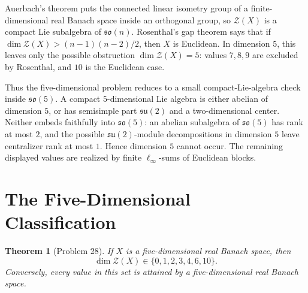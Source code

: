 \documentclass[11pt]{article}
\newtheorem{theorem}{Theorem}
\theoremstyle{remark}
\newcommand{\so}{\mathfrak{so}}
\newcommand{\su}{\mathfrak{su}}
\begin{document}
Auerbach's theorem puts the connected linear isometry group of a
finite-dimensional real Banach space inside an orthogonal group, so
\(\mathcal Z(X)\) is a compact Lie subalgebra of \(\so(n)\).  Rosenthal's
gap theorem says that if \(\dim\mathcal Z(X)>(n-1)(n-2)/2\), then \(X\) is
Euclidean.  In dimension \(5\), this leaves only the possible obstruction
\(\dim\mathcal Z(X)=5\): values \(7,8,9\) are excluded by Rosenthal, and
\(10\) is the Euclidean case.

Thus the five-dimensional problem reduces to a small compact-Lie-algebra
check inside \(\so(5)\).  A compact \(5\)-dimensional Lie algebra is either
abelian of dimension \(5\), or has semisimple part \(\su(2)\) and a
two-dimensional center.  Neither embeds faithfully into \(\so(5)\): an
abelian subalgebra of \(\so(5)\) has rank at most \(2\), and the possible
\(\su(2)\)-module decompositions in dimension \(5\) leave centralizer rank at
most \(1\).  Hence dimension \(5\) cannot occur.  The remaining displayed
values are realized by finite \(\ell_\infty\)-sums of Euclidean blocks.

\section{The Five-Dimensional Classification}

\begin{theorem}[Problem 28]\label{thm:five}
If \(X\) is a five-dimensional real Banach space, then
\[
 \dim\mathcal Z(X)\in\{0,1,2,3,4,6,10\}.
\]
Conversely, every value in this set is attained by a five-dimensional real
Banach space.
\end{theorem}
\end{document}
